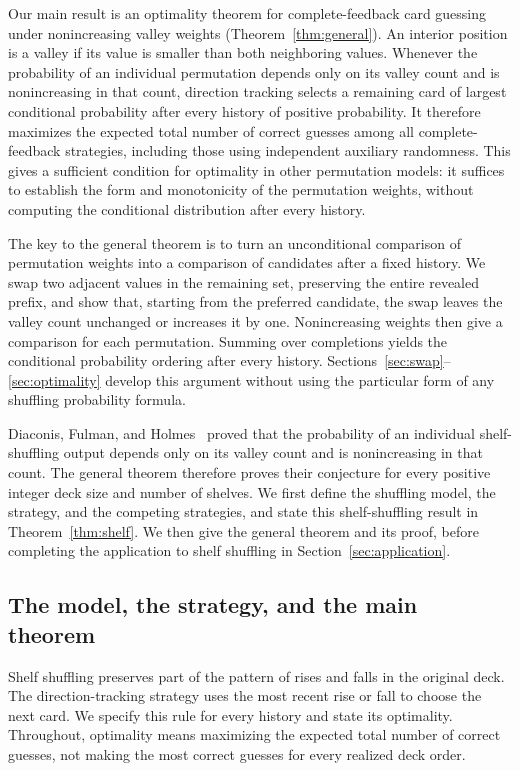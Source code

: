 \documentclass[10pt,a4paper]{amsart}
\numberwithin{equation}{section}
\begin{document}
Our main result is an optimality theorem for complete-feedback card guessing under nonincreasing valley weights (Theorem~\ref{thm:general}). An interior position is a valley if its value is smaller than both neighboring values. Whenever the probability of an individual permutation depends only on its valley count and is nonincreasing in that count, direction tracking selects a remaining card of largest conditional probability after every history of positive probability. It therefore maximizes the expected total number of correct guesses among all complete-feedback strategies, including those using independent auxiliary randomness. This gives a sufficient condition for optimality in other permutation models: it suffices to establish the form and monotonicity of the permutation weights, without computing the conditional distribution after every history.

The key to the general theorem is to turn an unconditional comparison of permutation weights into a comparison of candidates after a fixed history. We swap two adjacent values in the remaining set, preserving the entire revealed prefix, and show that, starting from the preferred candidate, the swap leaves the valley count unchanged or increases it by one. Nonincreasing weights then give a comparison for each permutation. Summing over completions yields the conditional probability ordering after every history. Sections~\ref{sec:swap}--\ref{sec:optimality} develop this argument without using the particular form of any shuffling probability formula.

Diaconis, Fulman, and Holmes~\cite[Theorem 3.1 and Corollary 3.3]{DFH} proved that the probability of an individual shelf-shuffling output depends only on its valley count and is nonincreasing in that count. The general theorem therefore proves their conjecture for every positive integer deck size and number of shelves. We first define the shuffling model, the strategy, and the competing strategies, and state this shelf-shuffling result in Theorem~\ref{thm:shelf}. We then give the general theorem and its proof, before completing the application to shelf shuffling in Section~\ref{sec:application}.
\subsection{The model, the strategy, and the main theorem}\label{sec:model}
Shelf shuffling preserves part of the pattern of rises and falls in the original deck. The direction-tracking strategy uses the most recent rise or fall to choose the next card. We specify this rule for every history and state its optimality. Throughout, optimality means maximizing the expected total number of correct guesses, not making the most correct guesses for every realized deck order.
\end{document}
